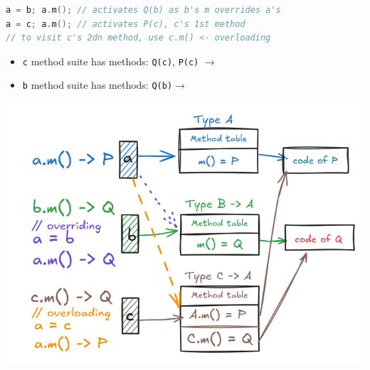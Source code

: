 \documentclass[10pt,a4paper,landscape]{article}
\begin{document}
\begin{multicols*}{3}
\begin{lstlisting}[language=c]
a = b; a.m(); // activates Q(b) as b's m overrides a's
a = c; a.m(); // activates P(c), c's 1st method
// to visit c's 2dn method, use c.m() <- overloading
\end{lstlisting}
\begin{itemize}
\item \texttt{c} method suite has  methods: \texttt{Q(c)}, \texttt{P(c)} $\to$ 
\item \texttt{b} method suite has  methods: \texttt{Q(b)}$\to$ 
\end{itemize}
\includegraphics*[width=\linewidth]{img/overloadevsoverride}
\end{multicols*}
\end{document}
